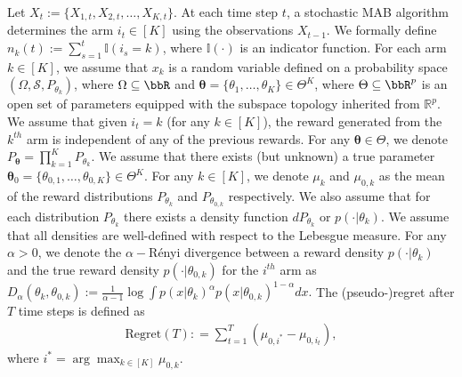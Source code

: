 \documentclass[11pt]{article}
\newcommand{\Ind}{\mathbb{I}}
\newcommand{\given}{\,|\,}   %
\begin{document}
\hspace{-3em} Let $X_t:=\{X_{1,t},X_{2,t},\ldots,X_{K,t}\}$.  At each time step $t$, a stochastic MAB algorithm determines the arm $i_t \in [K]$  using the observations $X_{t-1}$. We formally define $n_k(t):= \sum_{s=1}^{t}\Ind(i_s = k)$, where $\Ind(\cdot)$ is an indicator function. For each arm $k\in [K]$, we assume that $x_k$ is a random variable defined on a probability space 
$(\Omega,\mathcal{S},P_{\theta_k})$, where $\Omega\subseteq \bbR$ and $\pmb \theta =\{\theta_1,\ldots,\theta_K\} \in\Theta^{K}$, where $\Theta \subseteq \bbR^p$  is an open set of parameters equipped with the subspace topology inherited from $\mathbb{R}^p$. We assume that given $i_t=k$ (for any $k\in[K]$), the reward generated from the $k^{th}$ arm is independent of any of the previous rewards. 
For any $\pmb \theta \in \Theta$, we denote $P_{\pmb \theta} = \prod_{k=1}^{K} P_{\theta_k}$. We assume that there exists (but unknown) a true parameter $\pmb \theta_0 = \{\theta_{0,1},\ldots,\theta_{0,K}\} \in \Theta^K $. For any $k\in [K]$, we denote $\mu_k$ and $\mu_{0,k}$ as the mean of the reward distributions $P_{\theta_k}$ and $P_{\theta_{0,k}}$ respectively.  We also assume that for each distribution $P_{\theta_k}$ there exists a density function $dP_{\theta_k}$ or $p(\cdot|\theta_k)$. 
We assume that all densities are well-defined with respect to the Lebesgue measure. For any $\alpha >0$, we denote the $\alpha-$R\'enyi divergence between a reward density $p(\cdot|\theta_k)$ and the true reward density $p(\cdot|\theta_{0,k})$ for the $i^{th}$ arm as
        \(D_{\alpha}(\theta_k,\theta_{0,k}) := \frac{1}{\alpha-1} \log \int p(x|\theta_k)^{\alpha} p(x|\theta_{0,k})^{1-\alpha} dx. \) 
\nomenclature[d]{$D_{\alpha}(\theta,\nu)$}{$\frac{1}{\alpha-1} \log \int p(x\given \theta)^{\alpha} p(x\given \nu)^{1-\alpha} dx$ for any $\alpha>0$}
\nomenclature[p]{$dP_{\cdot} \text{ or } p(\cdot\given \cdot)$}{density of $P_{\cdot}$} 
The (pseudo-)regret after $T$ time steps is defined as 
\begin{align}
    \text{Regret}(T) : =  \sum_{t=1}^{T} \left(\mu_{0,i^*} - \mu_{0,i_t} \right) ,
\end{align}  
where $i^* = \arg\max_{k\in[K]} \mu_{0,k} $. 
\end{document}
